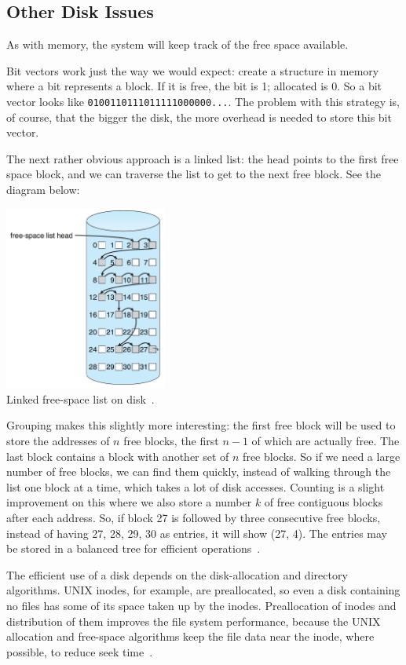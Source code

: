 \subsection*{Other Disk Issues}
As with memory, the system will keep track of the free space available.

Bit vectors work just the way we would expect: create a structure in memory where a bit represents a block. If it is free, the bit is 1; allocated is 0. So a bit vector looks like \texttt{0100110111011111000000...}. The problem with this strategy is, of course, that the bigger the disk, the more overhead is needed to store this bit vector.

The next rather obvious approach is a linked list: the head points to the first free space block, and we can traverse the list to get to the next free block. See the diagram below:

\begin{center}
	\includegraphics[width=0.4\textwidth]{images/disk-linked-list.png}\\
	Linked free-space list on disk~\cite{osc}.
\end{center}

Grouping makes this slightly more interesting: the first free block will be used to store the addresses of $n$ free blocks, the first $n-1$ of which are actually free. The last block contains a block with another set of $n$ free blocks. So if we need a large number of free blocks, we can find them quickly, instead of walking through the list one block at a time, which takes a lot of disk accesses. Counting is a slight improvement on this where we also store a number $k$ of free contiguous blocks after each address. So, if block 27 is followed by three consecutive free blocks, instead of having 27, 28, 29, 30 as entries, it will show (27, 4). The entries may be stored in a balanced tree for efficient operations~\cite{osc}.


The efficient use of a disk depends on the disk-allocation and directory algorithms. UNIX inodes, for example, are preallocated, so even a disk containing no files has some of its space taken up by the inodes. Preallocation of inodes and distribution of them improves the file system performance, because the UNIX allocation and free-space algorithms keep the file data near the inode, where possible, to reduce seek time~\cite{osc}.

